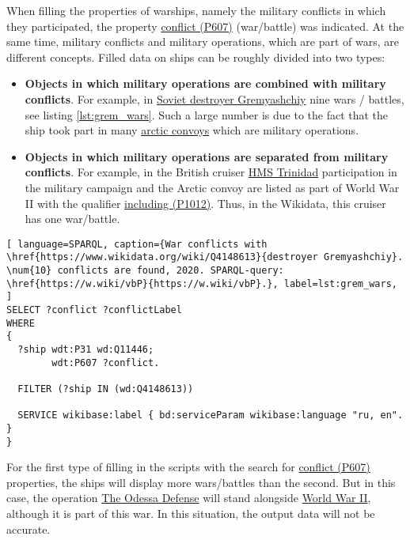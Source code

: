 When filling the properties of warships, namely the military conflicts in which they participated, the property \href{https://www.wikidata.org/wiki/Property:P607}{conflict (P607)} (war/battle) was indicated. At the same time, military conflicts and military operations, which are part of wars, are different concepts. Filled data on ships can be roughly divided into two types:
\begin{itemize}
  \item \textbf{Objects in which military operations are combined with military conflicts}. For example, in \href{https://www.wikidata.org/wiki/Q4148613}{Soviet destroyer Gremyashchiy} nine wars / battles, see listing \ref{lst:grem_wars}. Such a large number is due to the fact that the ship took part in many \href{https://en.wikipedia.org/wiki/Arctic_convoys_of_World_War_II}{arctic convoys} which are military operations.
  \item \textbf{Objects in which military operations are separated from military conflicts}. For example, in the British cruiser \href{https://en.wikipedia.org/wiki/HMS_Trinidad_(1940)}{HMS Trinidad} participation in the military campaign and the Arctic convoy are listed as part of World War II with the qualifier \href{https://www.wikidata.org/wiki/Property:P1012}{including (P1012)}. Thus, in the Wikidata, this cruiser has one war/battle.
\end{itemize}


\begin{lstlisting}[ language=SPARQL, caption={War conflicts with \href{https://www.wikidata.org/wiki/Q4148613}{destroyer Gremyashchiy}. \num{10} conflicts are found, 2020. SPARQL-query: \href{https://w.wiki/vbP}{https://w.wiki/vbP}.}, label=lst:grem_wars, ]
SELECT ?conflict ?conflictLabel
WHERE
{
  ?ship wdt:P31 wd:Q11446;
        wdt:P607 ?conflict.
      
  FILTER (?ship IN (wd:Q4148613))
                
  SERVICE wikibase:label { bd:serviceParam wikibase:language "ru, en". }
}
\end{lstlisting}


For the first type of filling in the scripts with the search for \href{https://www.wikidata.org/wiki/Property:P607}{conflict (P607)} properties, the ships will display more wars/battles than the second. But in this case, the operation \href{https://en.wikipedia.org/wiki/Siege_of_Odessa_(1941)}{The Odessa Defense} will stand alongside \href{https://en.wikipedia.org/wiki/World_War_II}{World War II}, although it is part of this war. In this situation, the output data will not be accurate.

